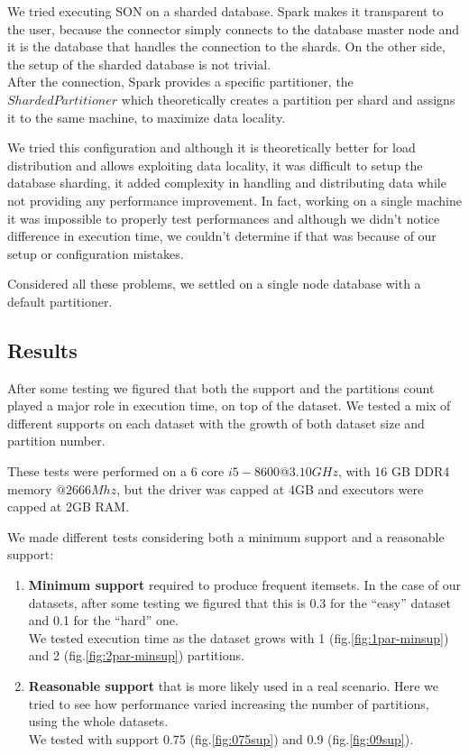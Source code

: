 \documentclass[a4paper]{article}
\begin{document}
	We tried executing SON on a sharded database. Spark makes it transparent to the user, because the connector simply connects to the database master node and it is the database that handles the
	connection to the shards. On the other side, the setup of the sharded database is not trivial.\\
	After the connection, Spark provides a specific partitioner, the $ShardedPartitioner$ which theoretically creates a partition per shard and assigns it to the same machine, to maximize data locality.

	We tried this configuration and although it is theoretically better for load distribution and allows exploiting data locality, it was difficult to setup the database sharding, it added complexity 
	in handling and distributing data while not providing any performance improvement. 
	In fact, working on a single machine it was impossible to properly test performances and although we didn't notice difference in execution time, we couldn't determine if that was because of our 
	setup or configuration mistakes.
	
	Considered all these problems, we settled on a single node database with a default partitioner.


	\subsection{Results}
	\label{section:results}
	After some testing we figured that both the support and the partitions count played a major role in execution time, on top of the dataset. We tested a mix of different supports on each dataset with the growth of both dataset size and partition number.

	These tests were performed on a 6 core $i5-8600 @3.10GHz$, with 16 GB DDR4 memory $@2666Mhz$, but the driver was capped at 4GB and executors were capped at 2GB RAM.
	
	We made different tests considering both a minimum support and a reasonable support:
	\begin{enumerate}
		\item \textbf{Minimum support} required to produce frequent itemsets. In the case of our datasets, after some testing we figured that this is 0.3 for the ``easy'' dataset and 0.1 for the ``hard'' one.\\
		We tested execution time as the dataset grows with 1 (fig.\ref{fig:1par-minsup}) and 2 (fig.\ref{fig:2par-minsup}) partitions.
		\item \textbf{Reasonable support} that is more likely used in a real scenario. Here we tried to see how performance varied increasing the number of partitions, using the whole datasets.\\
		We tested with support 0.75 (fig.\ref{fig:075sup}) and 0.9 (fig.\ref{fig:09sup}).
	\end{enumerate}
\end{document}
